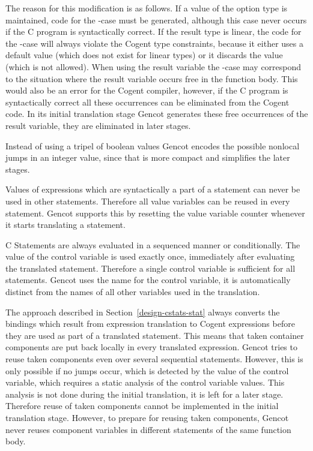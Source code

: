 The reason for this modification is as follows. If a value of the option type is maintained, code for the -case
must be generated, although this case never occurs if the C program is syntactically correct. If the result type  
is linear, the code for the -case will always violate the Cogent type constraints, because it either uses
a default value (which does not exist for linear types) or it discards the value (which is not allowed). When using the 
result variable the -case may correspond to the situation where the result variable occurs free in the function 
body. This would also be an error for the Cogent compiler, however, if the C program is syntactically correct all these
occurrences can be eliminated from the Cogent code. In its initial translation stage Gencot generates these free occurrences
of the result variable, they are eliminated in later stages.

Instead of using a tripel of boolean values Gencot encodes the possible nonlocal jumps in an integer value, since that is more
compact and simplifies the later stages.

Values of expressions which are syntactically a part of a statement can never be used in other statements. Therefore
all value variables can be reused in every statement. Gencot supports this by resetting the value variable counter 
whenever it starts translating a statement.

C Statements are always evaluated in a sequenced manner or conditionally. The value of the control variable is used exactly
once, immediately after evaluating the translated statement. Therefore a single control variable is sufficient for 
all statements. Gencot uses the name  for the control variable, it is automatically distinct from the names of
all other variables used in the translation.

The approach described in Section~\ref{design-cstats-stat} always converts the bindings which result from expression 
translation to Cogent expressions before they are used as part of a translated statement. This means that taken
container components are put back locally in every translated expression. Gencot tries to reuse taken components even 
over several sequential statements. However, this is only possible if no jumps occur, which is detected by the value
of the control variable, which requires a static analysis of the control variable values. This analysis is not done
during the initial translation, it is left for a later stage. Therefore reuse of taken components cannot be implemented
in the initial translation stage. However, to prepare for reusing taken components, Gencot never reuses component variables
in different statements of the same function body.

